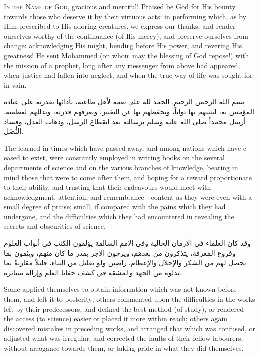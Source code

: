 \documentclass[11pt,a4paper,openany,oneside]{book}
\begin{document}
\lettrine[lines=3, lhang=0.33, nindent=0em, findent=3pt, loversize=0.14]{
\textcolor{dropgold}{I}}{n the Name of God,} gracious and merciful! Praised be God for His bounty
towards those who deserve it by their virtuous acts: in performing which, as by
Him prescribed to His adoring creatures, we express our thanks, and render
ourselves worthy of the continuance (of His mercy), and preserve ourselves from
change: acknowledging His might, bending before His power, and revering His
greatness! He sent Mohammed (on whom may the blessing of God repose!) with the
mission of a prophet, long after any messenger from above had appeared, when
justice had fallen into neglect, and when the true way of life was sought for
in vain.

\begin{arabicbox}
\begin{Arabic}
بسم الله الرحمن الرحيم. الحمد لله على نعمه لأهل طاعته، بأدائها
بقدرته على عباده المؤمنين به، ليثيبهم بها ثواباً، ويحفظهم بها
عن التغيير، ويعرفهم قدرته، ويذللهم لعظمته. أرسل محمداً صلى الله
عليه وسلم برسالته بعد انقطاع الرسل، وذهاب العدل، وفساد النُُّصُل.
\end{Arabic}
\end{arabicbox}

The learned in times which have passed away, and among nations which have
c eased to exist, were constantly employed in writing books on the several
departments of science and on the various branches of knowledge, bearing in
mind those that were to come after them, and hoping for a reward proportionate
to their ability, and trusting that their endeavours would meet with
acknowledgment, attention, and remembrance---content as they were even with a
small degree of praise; small, if compared with the pains which they had
undergone, and the difficulties which they had encountered in revealing the
secrets and obscurities of science.

\begin{arabicbox}
\begin{Arabic}
وقد كان العلماء في الأزمان الخالية وفي الأمم السالفة يؤلفون
الكتب في أبواب العلوم وفروع المعرفة، يتذكرون من بعدهم، ويرجون
الأجر بقدر ما كان منهم، ويثقون بما يحصل لهم من الشكر
والإجلال والإعظام، راضين ولو بقليل من الثناء، قليلاً مقارنةً
بما بذلوه من الجهد والمشقة في كشف خفايا العلم وإزالة
ستائره.
\end{Arabic}
\end{arabicbox}

Some applied themselves to obtain information which was not known before them,
and left it to posterity; others commented upon the difficulties in the works
left by their predecessors, and defined the best method (of study), or
rendered the access (to science) easier or placed it more within reach; others
again discovered mistakes in preceding works, and arranged that which was
confused, or adjusted what was irregular, and corrected the faults of their
fellow-labourers, without arrogance towards them, or taking pride in what they
did themselves.
\end{document}
